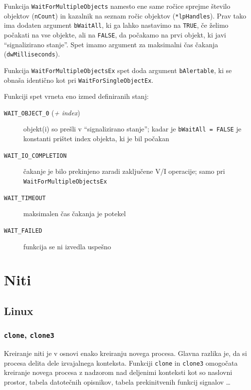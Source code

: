\documentclass[a4paper,12pt,openright]{book}
\begin{document}
Funkcija \texttt{WaitForMultipleObjects} namesto ene same ročice sprejme število objektov (\texttt{nCount}) in kazalnik na seznam ročic objektov (\texttt{*lpHandles}).
Prav tako ima dodaten argument \texttt{bWaitAll}, ki ga lahko nastavimo na \texttt{TRUE}, če želimo počakati na vse objekte, ali na \texttt{FALSE}, da počakamo na prvi objekt, ki javi ``signalizirano stanje''.
Spet imamo argument za maksimalni čas čakanja (\texttt{dwMilliseconds}).

Funkcija \texttt{WaitForMultipleObjectsEx} spet doda argument \texttt{bAlertable}, ki se obnaša identično kot pri \texttt{WaitForSingleObjectEx}.

Funkciji spet vrneta eno izmed definiranih stanj:
\begin{description}
	\item[\texttt{WAIT\_OBJECT\_0} (\textit{+ index})] objekt(i) so prešli v ``signalizirano stanje''; kadar je \texttt{bWaitAll = FALSE} je konstanti prištet index objekta, ki je bil počakan
	\item[\texttt{WAIT\_IO\_COMPLETION}] čakanje je bilo prekinjeno zaradi zaključene V/I operacije; samo pri \texttt{WaitForMultipleObjectsEx}
	\item[\texttt{WAIT\_TIMEOUT}] maksimalen čas čakanja je potekel
	\item[\texttt{WAIT\_FAILED}] funkcija se ni izvedla uspešno
\end{description}

\section{Niti} \label{sec:threads}

\subsection{Linux} \label{ssec:linux_syscalls:threads}

\subsubsection{\texttt{clone}, \texttt{clone3}}

Kreiranje niti je v osnovi enako kreiranju novega procesa.
Glavna razlika je, da si procesa delita dele izvajalnega konteksta.
Funkciji \texttt{clone} in \texttt{clone3} omogočata kreiranje novega procesa z nadzorom nad deljenimi konteksti kot so naslovni prostor, tabela datotečnih opisnikov, tabela prekinitvenih funkcij signalov \dots
\end{document}
